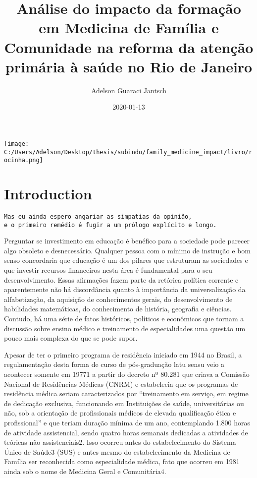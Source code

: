 \documentclass[]{book}
\title{Análise do impacto da formação em Medicina de Família e Comunidade na reforma da atenção primária à saúde no Rio de Janeiro}
\author{Adelson Guaraci Jantsch}
\date{2020-01-13}
\begin{document}
\maketitle

{
\setcounter{tocdepth}{1}
\tableofcontents
}
\hypertarget{section}{%
\chapter*{}\label{section}}

\texttt{[image: C:/Users/Adelson/Desktop/thesis/subindo/family\_medicine\_impact/livro/rocinha.png]}

\hypertarget{introduction}{%
\chapter*{Introduction}\label{introduction}}

\begin{verbatim}
Mas eu ainda espero angariar as simpatias da opinião, 
e o primeiro remédio é fugir a um prólogo explícito e longo.
\end{verbatim}

Perguntar se investimento em educação é benéfico para a sociedade pode parecer algo obsoleto e desnecessário. Qualquer pessoa com o mínimo de instrução e bom senso concordaria que educação é um dos pilares que estruturam as sociedades e que investir recursos financeiros nesta área é fundamental para o seu desenvolvimento. Essas afirmações fazem parte da retórica política corrente e aparentemente não há discordância quanto à importância da universalização da alfabetização, da aquisição de conhecimentos gerais, do desenvolvimento de habilidades matemáticas, do conhecimento de história, geografia e ciências. Contudo, há uma série de fatos históricos, políticos e econômicos que tornam a discussão sobre ensino médico e treinamento de especialidades uma questão um pouco mais complexa do que se pode supor.

Apesar de ter o primeiro programa de residência iniciado em 1944 no Brasil, a regulamentação desta forma de curso de pós-graduação latu sensu veio a acontecer somente em 19771 a partir do decreto nº 80.281 que criava a Comissão Nacional de Residências Médicas (CNRM) e estabelecia que os programas de residência médica seriam caracterizados por ``treinamento em serviço, em regime de dedicação exclusiva, funcionando em Instituições de saúde, universitárias ou não, sob a orientação de profissionais médicos de elevada qualificação ética e profissional'' e que teriam duração mínima de um ano, contemplando 1.800 horas de atividade assistencial, sendo quatro horas semanais dedicadas a atividades de teóricas não assistenciais2. Isso ocorreu antes do estabelecimento do Sistema Único de Saúde3 (SUS) e antes mesmo do estabelecimento da Medicina de Família ser reconhecida como especialidade médica, fato que ocorreu em 1981 ainda sob o nome de Medicina Geral e Comunitária4.
\end{document}
